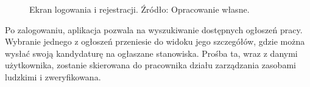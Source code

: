 \documentclass[twoside]{projektInzynierskiMS}
\numberwithin{figure}{section}
\begin{document}
\begin{figure}[h!]
{\hfill
}
\caption{Ekran logowania i rejestracji. Źródło: Opracowanie własne.}
\label{fig:mobile_login_register}
\end{figure}
\newpage
Po zalogowaniu, aplikacja pozwala na wyszukiwanie dostępnych ogłoszeń pracy. Wybranie jednego z ogłoszeń przeniesie do widoku jego szczegółów, gdzie można wysłać swoją kandydaturę na ogłaszane stanowiska. Prośba ta, wraz z danymi użytkownika, zostanie skierowana do pracownika działu zarządzania zasobami ludzkimi i zweryfikowana. 

\begin{figure}[h!]
\end{figure}
\end{document}
